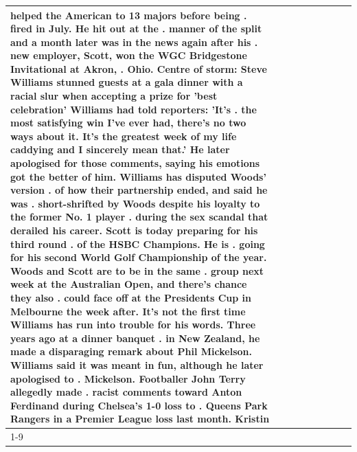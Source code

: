 \begin{table}[H]
\begin{tabular}{lllrlllll}
helped the American to 13 majors before being . fired in July. He hit out at the . manner of the split and a month later was in the news again after his . new employer, Scott, won the WGC Bridgestone Invitational at Akron, . Ohio. Centre of storm: Steve Williams stunned guests at a gala dinner with a racial slur when accepting a prize for 'best celebration' Williams had told reporters: 'It's . the most satisfying win I've ever had, there's no two ways about it. It's the greatest week of my life caddying and I sincerely mean that.' He later apologised for those comments, saying his emotions got the better of him. Williams has disputed Woods' version . of how their partnership ended, and said he was . short-shrifted by Woods despite his loyalty to the former No. 1 player . during the sex scandal that derailed his career. Scott is today preparing for his third round . of the HSBC Champions. He is . going for his second World Golf Championship of the year. Woods and Scott are to be in the same . group next week at the Australian Open, and there's chance they also . could face off at the Presidents Cup in Melbourne the week after. It's not the first time Williams has run into trouble for his words. Three years ago at a dinner banquet . in New Zealand, he made a disparaging remark about Phil Mickelson. Williams said it was meant in fun, although he later apologised to . Mickelson. Footballer John Terry allegedly made . racist comments toward Anton Ferdinand during Chelsea's 1-0 loss to . Queens Park Rangers in a Premier League loss last month. Kristin \\
\cline{1-9}

\end{tabular}
\end{table}
